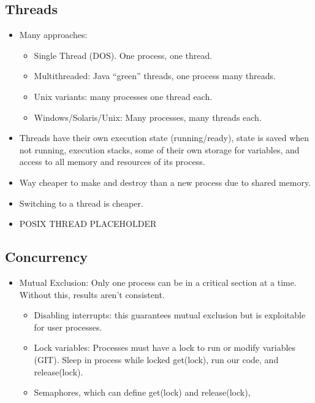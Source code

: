 \documentclass[fontsize=5pt]{scrartcl}
\begin{document}
\begin{multicols}{3}
     \subsection{Threads}
      \begin{itemize}
       \item Many approaches: 
       \begin{itemize}
        \item Single Thread (DOS). One process, one thread.
        \item Multithreaded: Java ``green'' threads, one process many threads.
        \item Unix variants: many processes one thread each.
        \item Windows/Solaris/Unix: Many processes, many threads each.
       \end{itemize}
       \item Threads have their own execution state (running/ready), state is saved when not running, execution stacks, 
             some of their own storage for variables, and access to all memory and resources of its process.
       \item Way cheaper to make and destroy than a new process due to shared memory.
       \item Switching to a thread is cheaper.
       \item {{POSIX THREAD PLACEHOLDER}}
      \end{itemize}
      
      \subsection{Concurrency}
        \begin{itemize}
         \item Mutual Exclusion: Only one process can be in a critical section at a time. Without this, results aren't consistent.
         \begin{itemize}
          \item Disabling interrupts: this guarantees mutual exclusion but is exploitable for user processes. 
          \item Lock variables: Processes must have a lock to run or modify variables (GIT). Sleep in process while locked
                get(lock), run our code, and release(lock).
          \item Semaphores, which can define get(lock) and release(lock), 
         \end{itemize}


\end{itemize}
\end{multicols}
\end{document}
